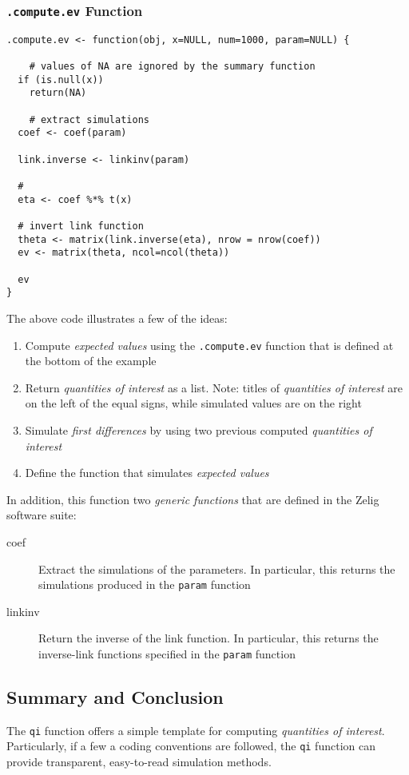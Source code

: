 \documentclass{article}
\newcommand{\code}[1]{{\tt #1}}
\begin{document}
\subsubsection{\code{.compute.ev} Function}
\begin{verbatim}
.compute.ev <- function(obj, x=NULL, num=1000, param=NULL) {

	# values of NA are ignored by the summary function
  if (is.null(x))
    return(NA)

	# extract simulations
  coef <- coef(param)
  
  link.inverse <- linkinv(param)

  # 
  eta <- coef %*% t(x)

  # invert link function
  theta <- matrix(link.inverse(eta), nrow = nrow(coef))
  ev <- matrix(theta, ncol=ncol(theta))

  ev
}  
\end{verbatim}

\noindent The above code illustrates a few of the ideas:

\begin{enumerate}

	\item Compute \emph{expected values} using the \code{.compute.ev} function
		that is defined at the bottom of the example
	
	\item Return \emph{quantities of interest} as a list. Note: titles of
		\emph{quantities of interest} are on the left of the equal signs, while
		simulated values are on the right
		
	\item Simulate \emph{first differences} by using two previous computed
	  \emph{quantities of interest}
	  
	\item Define the function that simulates \emph{expected values}

\end{enumerate}

\noindent In addition, this function two \emph{generic functions} that are
defined in the Zelig software suite:

\begin{description}

	\item[coef] Extract the simulations of the parameters. In particular, this
		returns the simulations produced in the \code{param} function
	
	\item[linkinv] Return the inverse of the link function. In particular, this
		returns the inverse-link functions specified in the \code{param} function

\end{description}

\subsection{Summary and Conclusion}

The \code{qi} function offers a simple template for computing \emph{quantities of
interest}. Particularly, if a few a coding conventions are followed, the \code{qi}
function can provide transparent, easy-to-read simulation methods.
\end{document}
